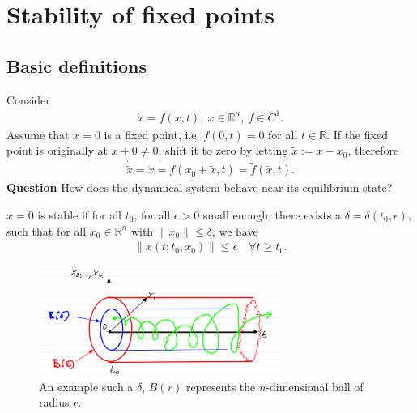 \chapter{Stability of fixed points}
\section{Basic definitions}
Consider
\begin{align}
	\dot{x}=f(x,t),\ x \in \mathbb{R}^{n},\ f\in C^{1}.
\end{align}
Assume that $x=0$ is a fixed point, i.e. $f(0,t) = 0$ for all $t \in \mathbb{R}$. If the fixed point is originally at $x+0\neq 0$, shift it to zero by letting $\tilde{x}:=x-x_0$, therefore 
\begin{align}
	\dot{\tilde{x}} = \dot{x} = f(x_0 + \tilde{x}, t) = \tilde{f}(\tilde{x}, t).
\end{align}
\textbf{Question} How does the dynamical system behave near its equilibrium state?

\begin{definition}
	$x=0$ is stable if for all $t_0$, for all $\epsilon>0$ small enough, there exists a $\delta=\delta(t_0, \epsilon)$, such that for all $x_0 \in \mathbb{R}^{n}$ with $\|x_0\| \leq \delta$, we have 
	\begin{align}
		\left \| x(t;t_0, x_0) \right\| \leq \epsilon \quad \forall t \geq t_0.
	\end{align}
\begin{figure}[h]
	\centering
	\includegraphics[width=0.7\textwidth]{figures/ch2/1lyapunov_stability.png}
	\caption{An example such a $\delta$, $B(r)$ represents the $n$-dimensional ball of radius $r$.}
\end{figure}
\end{definition}

